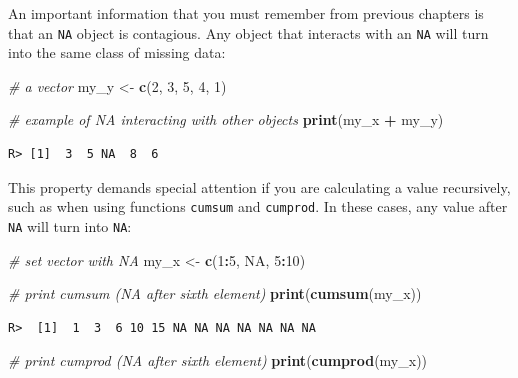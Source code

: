 \documentclass[
  12pt,
]{book}
\newenvironment{Shaded}{\begin{snugshade}}{\end{snugshade}}
\newcommand{\CommentTok}[1]{\textcolor[rgb]{0.37,0.37,0.37}{\textit{#1}}}
\newcommand{\DecValTok}[1]{\textcolor[rgb]{0.06,0.06,0.06}{#1}}
\newcommand{\KeywordTok}[1]{\textcolor[rgb]{0.27,0.27,0.27}{\textbf{#1}}}
\newcommand{\NormalTok}[1]{#1}
\newcommand{\OperatorTok}[1]{\textcolor[rgb]{0.43,0.43,0.43}{\textbf{#1}}}
\newcommand{\OtherTok}[1]{\textcolor[rgb]{0.37,0.37,0.37}{#1}}
\newcommand{\StringTok}[1]{\textcolor[rgb]{0.5,0.5,0.5}{#1}}
\begin{document}
An important information that you must remember from previous chapters is that an \texttt{NA} object is contagious. Any object that interacts with an \texttt{NA} will turn into the same class of missing data:

\begin{Shaded}
\begin{Highlighting}[]
\CommentTok{# a vector }
\NormalTok{my_y <-}\StringTok{ }\KeywordTok{c}\NormalTok{(}\DecValTok{2}\NormalTok{, }\DecValTok{3}\NormalTok{, }\DecValTok{5}\NormalTok{, }\DecValTok{4}\NormalTok{, }\DecValTok{1}\NormalTok{)}

\CommentTok{# example of NA interacting with other objects}
\KeywordTok{print}\NormalTok{(my_x }\OperatorTok{+}\StringTok{ }\NormalTok{my_y)}
\end{Highlighting}
\end{Shaded}

\begin{verbatim}
R> [1]  3  5 NA  8  6
\end{verbatim}

This property demands special attention if you are calculating a value recursively, such as when using functions \texttt{cumsum} and \texttt{cumprod}. In these cases, any value after \texttt{NA} will turn into \texttt{NA}:

\begin{Shaded}
\begin{Highlighting}[]
\CommentTok{# set vector with NA}
\NormalTok{my_x <-}\StringTok{ }\KeywordTok{c}\NormalTok{(}\DecValTok{1}\OperatorTok{:}\DecValTok{5}\NormalTok{, }\OtherTok{NA}\NormalTok{, }\DecValTok{5}\OperatorTok{:}\DecValTok{10}\NormalTok{)}

\CommentTok{# print cumsum (NA after sixth element)}
\KeywordTok{print}\NormalTok{(}\KeywordTok{cumsum}\NormalTok{(my_x))}
\end{Highlighting}
\end{Shaded}

\begin{verbatim}
R>  [1]  1  3  6 10 15 NA NA NA NA NA NA NA
\end{verbatim}

\begin{Shaded}
\begin{Highlighting}[]
\CommentTok{# print cumprod (NA after sixth element)}
\KeywordTok{print}\NormalTok{(}\KeywordTok{cumprod}\NormalTok{(my_x))}
\end{Highlighting}
\end{Shaded}
\end{document}

